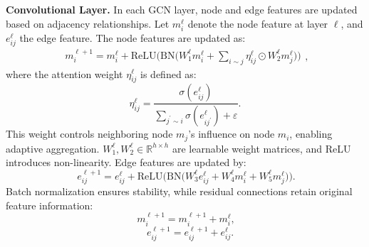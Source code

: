\documentclass[sigconf]{acmart}
\begin{document}
\textbf{Convolutional Layer.} In each GCN layer, node and edge features are updated based on adjacency relationships. Let $m_{i}^{\ell}$ denote the node feature at layer $\ell$, and $e_{ij}^{\ell}$ the edge feature. The node features are updated as:
\begin{equation}
    \begin{array}{rcl}m_i^{\ell+1}=m_i^\ell+\mathrm{ReLU}\Big(\mathrm{BN}\Big(W_1^\ell m_i^\ell+\sum_{i\sim j}\eta_{ij}^\ell\odot W_2^\ell m_j^\ell\Big)\Big)\end{array},
\end{equation}
where the attention weight $\eta_{ij}^{\ell}$ is defined as:
\begin{equation}
    \eta_{ij}^{\ell}=\frac{\sigma(e_{ij}^{\ell})}{\sum_{j^{\prime}\sim i}\sigma(e_{ij^{\prime}}^{\ell})+\varepsilon}.
\end{equation}
This weight controls neighboring node $m_j$'s influence on node $m_i$, enabling adaptive aggregation. $W_1^\ell,W_2^\ell\in\mathbb{R}^{h\times h}$ are learnable weight matrices, and ReLU introduces non-linearity. Edge features are updated by:
\begin{equation}
    \ e_{ij}^{\ell+1}= e_{ij}^{\ell}+\mathrm{ReLU}\Big(\mathrm{BN}\Big(W_{3}^{\ell}e_{ij}^{\ell}+W_{4}^{\ell}m_{i}^{\ell}+W_{5}^{\ell}m_{j}^{\ell}\Big)\Big).
\end{equation}
Batch normalization ensures stability, while residual connections retain original feature information:
\begin{equation}
    \ m_i^{\ell+1}=m_i^{\ell+1}+m_i^{\ell},
\end{equation}
\begin{equation}
    \quad e_{ij}^{\ell+1}=e_{ij}^{\ell+1}+e_{ij}^{\ell}.
\end{equation}
\end{document}
